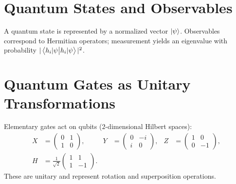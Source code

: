 \section{Quantum States and Observables}
A quantum state is represented by a normalized vector $\ket{\psi}$. Observables correspond to Hermitian operators; measurement yields an eigenvalue with probability $|\braket{h_i|\psi}|^2$.

\section{Quantum Gates as Unitary Transformations}
Elementary gates act on qubits ($2$-dimensional Hilbert spaces):
\begin{align*}
	X &= \begin{pmatrix}0 & 1\\1 & 0\end{pmatrix}, & Y &= \begin{pmatrix}0 & -i\\ i & 0\end{pmatrix}, & Z &= \begin{pmatrix}1 & 0\\ 0 & -1\end{pmatrix}, \\
	H &= \frac{1}{\sqrt2}\begin{pmatrix}1 & 1\\1 & -1\end{pmatrix}.
\end{align*}
These are unitary and represent rotation and superposition operations.
